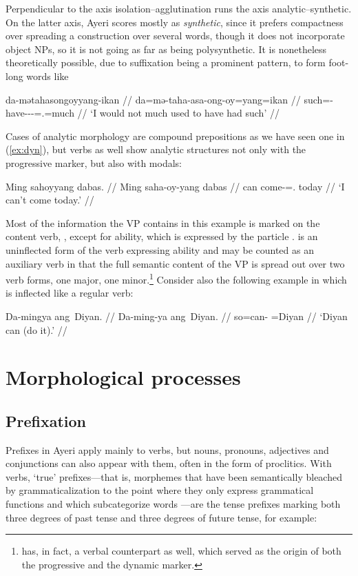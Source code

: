 Perpendicular to the axis isolation–agglutination runs the axis 
analytic–syn\-thetic. On the latter axis, Ayeri scores mostly as 
\emph{synthetic}, since it prefers compactness over spreading a construction 
over several words, though it does not incorporate object NPs, so it is not 
going as far as being poly\-syn\-thetic. It is nonetheless theoretically 
possible, due to suffixation being a prominent pattern, to form foot-long words 
like

\ex\begingl
	\gla da-mətahasongoyyang-ikan //
	\glb da=mə-taha-asa-ong-oy=yang=ikan //
	\glc such=\Pst{}-have-\Hab{}-\Irr{}-\Neg{}=\Fsg{}.\Aarg{}=much //
	\glft `I would not much used to have had such' //
\endgl\xe

Cases of analytic morphology are compound prepositions as we have seen 
one in 
(\ref{ex:dyn}), but verbs as well show analytic structures not only with the 
progressive marker, but also with modals:

\ex\begingl
	\gla Ming sahoyyang dabas. //
	\glb Ming saha-oy-yang dabas //
	\glc can come-\Neg{}=\Fsg{}.\Aarg{} today //
	\glft `I can't come today.' //
\endgl\xe

Most of the information the VP contains in this example is marked on the 
content verb, , except for ability, which is expressed 
by the particle .  is an uninflected form 
of the verb expressing ability and may be counted as an auxiliary verb in 
that the full semantic content of the VP is spread out over two verb forms, 
one major, one minor.\footnote{ has, in fact, a verbal 
counterpart  as well, which served as the origin 
of both the progressive and the dynamic marker.} Consider also the following 
example in which  is inflected like a regular verb:

\ex\begingl
	\gla Da-mingya ang~Diyan. //
	\glb Da-ming-ya ang~Diyan. //
	\glc so=can-\TsgM{} \Aarg{}=Diyan //
	\glft `Diyan can (do it).' //
\endgl\xe

\section{Morphological processes}

\subsection{Prefixation}

Prefixes in Ayeri apply mainly to verbs, but nouns, pronouns, adjectives and 
conjunctions can also appear with them, often in the form of 
proclitics. With verbs, `true' prefixes---that is, morphemes that 
have been semantically bleached by grammaticalization to the point where they 
only express grammatical functions \citep[157ff.]{lehmann2015} and which 
subcategorize words \citep[117]{klavans1985}---are the tense prefixes marking 
both three degrees of past tense and three degrees of future tense, for example:

